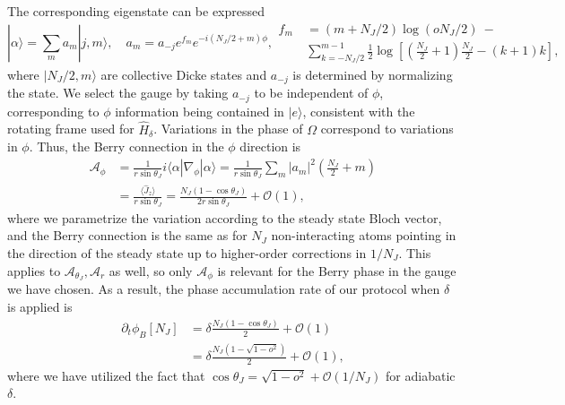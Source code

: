 \documentclass[11pt]{article}
\begin{document}
The corresponding eigenstate can be expressed \cite{Somech2024}
\begin{subequations}
\begin{equation}
    |\alpha \rangle = \sum_m a_m |j,m \rangle, \quad
    a_m = a_{-j}e^{f_m} e^{-i (N_J/2 + m) \phi}, 
\end{equation}
\begin{equation}
\begin{aligned}
    f_m ~&= (m+N_J/2) \log (o N_J/2) ~- \\ & \sum_{k = -N_J/2}^{m-1} \frac{1}{2} \log \left[\left(\frac{N_J}{2}+1\right) \frac{N_J}{2}-(k+1)k\right],
\end{aligned}
\end{equation}
\end{subequations}
where $|N_J/2,m\rangle$ are collective Dicke states and $a_{-j}$ is determined by normalizing the state. We select the gauge by taking $a_{-j}$ to be independent of $\phi$, corresponding to $\phi$ information being contained in $|e\rangle$, consistent with the rotating frame used for $\hat H_\delta$. Variations in the phase of $\Omega$ correspond to variations in $\phi$. Thus, the Berry connection in the $\phi$ direction is 
\begin{equation}
\begin{aligned}
    \mathcal{A}_\phi &= \frac{1}{r \sin \theta_J} i \langle \alpha| \nabla_\phi|\alpha \rangle = \frac{1}{r \sin \theta_J} \sum_m |a_m|^2 \left( \frac{N_J}{2} + m \right) \\
    &= \frac{\langle \hat J_z \rangle}{r \sin \theta_J} = \frac{N_J(1- \cos \theta_J)}{2 r \sin \theta_J} + \mathcal{O}(1),
\end{aligned}
\end{equation}
where we parametrize the variation according to the steady state Bloch vector, and the Berry connection is the same as for $N_J$ non-interacting atoms pointing in the direction of the steady state up to higher-order corrections in $1/N_J$. This applies to $\mathcal{A}_{\theta_J}, \mathcal{A}_r$ as well, so only $\mathcal{A}_\phi$ is relevant for the Berry phase in the gauge we have chosen. As a result, the phase accumulation rate of our protocol when $\delta$ is applied is 
\begin{equation}
\begin{aligned}
    \partial_t \phi_B[N_J] &= \delta \frac{N_J (1-\cos \theta_J)}{2}  + \mathcal{O}(1)\\
    &= \delta \frac{N_J (1-\sqrt{1 - o^2})}{2}+ \mathcal{O}(1),
\end{aligned}
\end{equation}
where we have utilized the fact that $\cos \theta_J = \sqrt{1-o^2} + \mathcal{O}(1/N_J)$ for adiabatic $\delta$.
\end{document}
